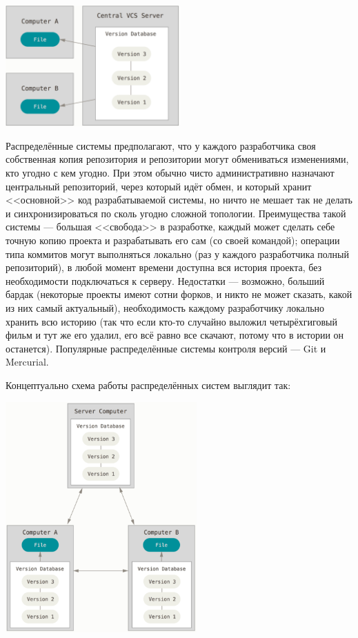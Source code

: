 \documentclass{../../text-style}
\begin{document}
\begin{center}
    \includegraphics[width=0.5\textwidth]{centralizedVcs.png}
\end{center}

Распределённые системы предполагают, что у каждого разработчика своя собственная копия репозитория и репозитории могут обмениваться изменениями, кто угодно с кем угодно. При этом обычно чисто административно назначают центральный репозиторий, через который идёт обмен, и который хранит <<основной>> код разрабатываемой системы, но ничто не мешает так не делать и синхронизироваться по сколь угодно сложной топологии. Преимущества такой системы --- большая <<свобода>> в разработке, каждый может сделать себе точную копию проекта и разрабатывать его сам (со своей командой); операции типа коммитов могут выполняться локально (раз у каждого разработчика полный репозиторий), в любой момент времени доступна вся история проекта, без необходимости подключаться к серверу. Недостатки --- возможно, больший бардак (некоторые проекты имеют сотни форков, и никто не может сказать, какой из них самый актуальный), необходимость каждому разработчику локально хранить всю историю (так что если кто-то случайно выложил четырёхгиговый фильм и тут же его удалил, его всё равно все скачают, потому что в истории он останется). Популярные распределённые системы контроля версий --- Git и Mercurial.

Концептуально схема работы распределённых систем выглядит так:

\begin{center}
    \includegraphics[width=0.55\textwidth]{distributedVcs.png}
\end{center}
\end{document}
